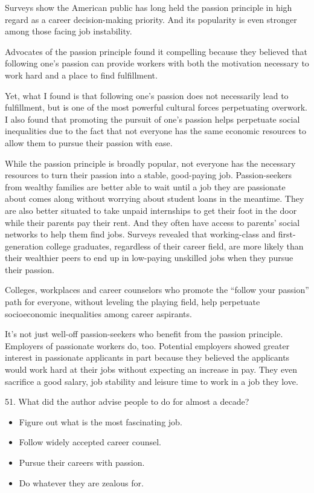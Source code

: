 \documentclass[UTF8,11pt]{ctexart}
\begin{document}
Surveys show the American public has long held the passion principle in high regard as a career decision-making priority. And its popularity is even stronger among those facing job instability.


Advocates of the passion principle found it compelling because they believed that following one’s passion can provide workers with both the motivation necessary to work hard and a place to find fulfillment.


Yet, what I found is that following one’s passion does not necessarily lead to fulfillment, but is one of the most powerful cultural forces perpetuating overwork. I also found that promoting the pursuit of one’s passion helps perpetuate social inequalities due to the fact that not everyone has the same economic resources to allow them to pursue their passion with ease.


While the passion principle is broadly popular, not everyone has the necessary resources to turn their passion into a stable, good-paying job. Passion-seekers from wealthy families are better able to wait until a job they are passionate about comes along without worrying about student loans in the meantime. They are also better situated to take unpaid internships to get their foot in the door while their parents pay their rent. And they often have access to parents’ social networks to help them find jobs. Surveys revealed that working-class and first-generation college graduates, regardless of their career field, are more likely than their wealthier peers to end up in low-paying unskilled jobs when they pursue their passion.


Colleges, workplaces and career counselors who promote the “follow your passion” path for everyone, without leveling the playing field, help perpetuate socioeconomic inequalities among career aspirants.


It’s not just well-off passion-seekers who benefit from the passion principle. Employers of passionate workers do, too. Potential employers showed greater interest in passionate applicants in part because they believed the applicants would work hard at their jobs without expecting an increase in pay. They even sacrifice a good salary, job stability and leisure time to work in a job they love.


51. What did the author advise people to do for almost a decade?


\begin{itemize}[leftmargin=2em,itemsep=.2em,topsep=.4em]\item[A.] Figure out what is the most fascinating job.
\item[B.] Follow widely accepted career counsel.
\item[C.] Pursue their careers with passion.
\item[D.] Do whatever they are zealous for.
\end{itemize}
\end{document}
